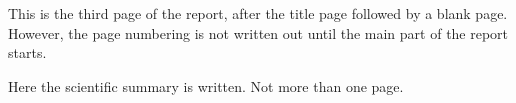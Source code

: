 \documentclass[../main.tex]{subfiles}
\begin{document}
This is the third page of the report, after the title page followed by a blank page. However, the page numbering is not written out until the main part of the report starts.

Here the scientific summary is written. Not more than one page.
\end{document}
